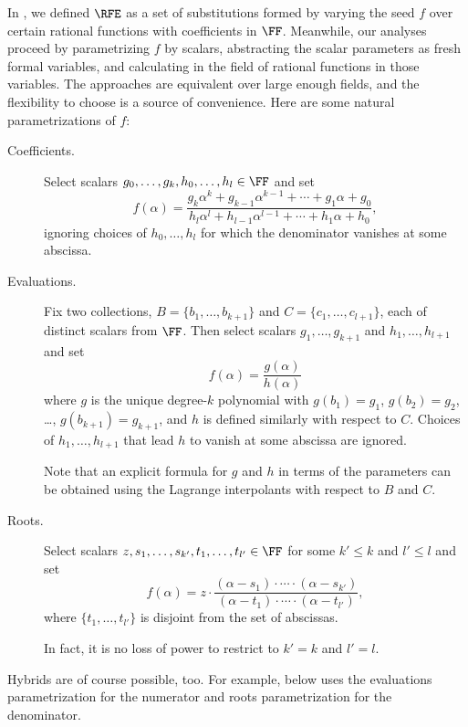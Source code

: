 In ,
we defined \(\RFE\) as a set of substitutions formed by varying the seed \(f\)
over certain rational functions with coefficients in \(\FF\).
Meanwhile,
our analyses proceed by parametrizing \(f\) by scalars,
abstracting the scalar parameters as fresh formal variables,
and calculating in the field of rational functions in those variables.
The approaches are equivalent over large enough fields, 
and the flexibility to choose is a source of convenience.
Here are some natural parametrizations of \(f\):
\begin{description}
  \item[Coefficients.]
    Select scalars \(g_0, \ldots, g_k, h_0,\ldots, h_l \in\FF\) and
    set
    \[
      f(\alpha) =
        \frac{
          g_k\alpha^k
          + g_{k-1} \alpha^{k-1}
          + \cdots
          + g_1 \alpha
          + g_0
        }{
          h_l\alpha^l
          + h_{l-1} \alpha^{l-1}
          + \cdots
          + h_1 \alpha
          + h_0
      },
    \]
    ignoring choices of \(h_0,\ldots,h_l\) for which the denominator
    vanishes at some abscissa.

  \item[Evaluations.]
    Fix two collections, \(B = \{b_1,\ldots,b_{k+1}\}\) and
    \(C = \{c_1,\ldots,c_{l+1}\}\), each of distinct scalars from \(\FF\).
    Then select scalars \(g_1, \ldots, g_{k+1}\) and \(h_1,\ldots,h_{l+1}\)
    and set
    \[
      f(\alpha) = \frac{ g(\alpha) }{ h(\alpha) }
    \]
    where \(g\) is the unique degree-\(k\) polynomial with
    \(g(b_1)=g_1\), \(g(b_2)=g_2\), \ldots, \(g(b_{k+1}) = g_{k+1}\),
    and \(h\) is defined similarly with respect to \(C\).
    Choices of \(h_1,\ldots,h_{l+1}\) that lead \(h\) to vanish at some
    abscissa are ignored.

    Note that an explicit formula for \(g\) and \(h\) in terms of the
    parameters can be obtained using the Lagrange interpolants with
    respect to \(B\) and \(C\).

  \item[Roots.]
    Select scalars \(z, s_1,\ldots,s_{k'}, t_1,\ldots,t_{l'} \in \FF\)
    for some \(k' \le k\) and \(l'\le l\) and set
    \[
      f(\alpha) = z \cdot
        \frac{ (\alpha - s_1) \cdot \cdots \cdot (\alpha - s_{k'}) }%
             { (\alpha - t_1) \cdot \cdots \cdot (\alpha - t_{l'}) },
    \]
    where \(\{t_1,\ldots,t_{l'}\}\) is disjoint from the set of abscissas.

    In fact, it is no loss of power to restrict to \(k'=k\) and
    \(l'=l\).
\end{description}
Hybrids are of course possible, too.
For example,  below uses the evaluations
parametrization for the numerator and roots parametrization for the
denominator.

